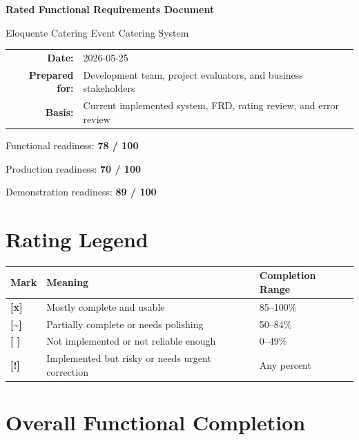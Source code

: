 \documentclass[11pt,a4paper]{article}
\newcommand{\statusdone}{\textbf{[x]}}
\newcommand{\statuspartial}{\textbf{[{\textasciitilde}]}}
\newcommand{\statusmissing}{\textbf{[ ]}}
\newcommand{\statusrisk}{\textbf{[!]}}
\begin{document}
\begin{titlepage}
    \centering
    \vspace*{1.5cm}
    {\Huge\bfseries\color{brandred} Rated Functional Requirements Document \par}
    \vspace{0.5cm}
    {\Large Eloquente Catering Event Catering System \par}
    \vspace{1.5cm}
    \begin{tabular}{rl}
        \textbf{Date:} & 2026-05-25 \\
        \textbf{Prepared for:} & Development team, project evaluators, and business stakeholders \\
        \textbf{Basis:} & Current implemented system, FRD, rating review, and error review \\
    \end{tabular}
    \vfill
    {\large Functional readiness: \textbf{78 / 100}\par}
    {\large Production readiness: \textbf{70 / 100}\par}
    {\large Demonstration readiness: \textbf{89 / 100}\par}
\end{titlepage}

\tableofcontents
\newpage

\section{Rating Legend}

\begin{longtable}{L{0.15\textwidth} L{0.55\textwidth} C{0.20\textwidth}}
\toprule
\textbf{Mark} & \textbf{Meaning} & \textbf{Completion Range} \\
\midrule
\statusdone & Mostly complete and usable & 85--100\% \\
\statuspartial & Partially complete or needs polishing & 50--84\% \\
\statusmissing & Not implemented or not reliable enough & 0--49\% \\
\statusrisk & Implemented but risky or needs urgent correction & Any percent \\
\bottomrule
\end{longtable}

\section{Overall Functional Completion}
\end{document}
